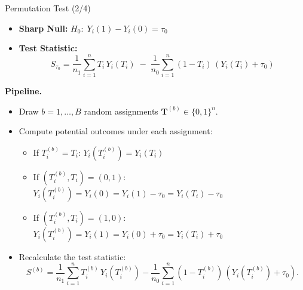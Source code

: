 \documentclass[10pt, handout]{beamer}
\theoremstyle{plain}
\begin{document}
\begin{frame}{Permutation Test (2/4)}

\small
\begin{itemize}
  \item \textbf{Sharp Null:}\; $H_0:\; Y_i(1)-Y_i(0)=\tau_0$
  \vspace{0.5em}
  \item \textbf{Test Statistic:}\;
  \[
  S_{\tau_0} = \frac{1}{n_1}\sum_{i=1}^n T_i\,Y_i(T_i)
  \;-\;
  \frac{1}{n_0}\sum_{i=1}^n (1-T_i)\,(Y_i(T_i) + \tau_0)
  \]
\end{itemize}

\pause
\vspace{0.8em}
\textbf{Pipeline.}
\begin{itemize}
  \setlength{\itemsep}{6pt}
  \item Draw $b = 1,\ldots,B$ random assignments $\bm{T}^{(b)} \in \{0,1\}^n$.
  \item Compute potential outcomes under each assignment:
  \begin{itemize}
    \setlength{\itemsep}{4pt}
    \item If $T_i^{(b)} = T_i$: $Y_i(T_i^{(b)}) = Y_i(T_i)$
    \item If $(T_i^{(b)}, T_i) = (0,1)$: $Y_i(T_i^{(b)}) = Y_i(0) = Y_i(1) - \tau_0 = Y_i(T_i) - \tau_0$
    \item If $(T_i^{(b)}, T_i) = (1,0)$: $Y_i(T_i^{(b)}) = Y_i(1) = Y_i(0) + \tau_0 = Y_i(T_i) + \tau_0$
  \end{itemize}
  \item Recalculate the test statistic:
  \[
  S^{(b)} = 
  \frac{1}{n_1}\sum_{i=1}^n T_i^{(b)}\,Y_i(T_i^{(b)})
  - 
  \frac{1}{n_0}\sum_{i=1}^n (1-T_i^{(b)})\,(Y_i(T_i^{(b)}) + \tau_0).
  \]
\end{itemize}
\end{frame}
\end{document}
